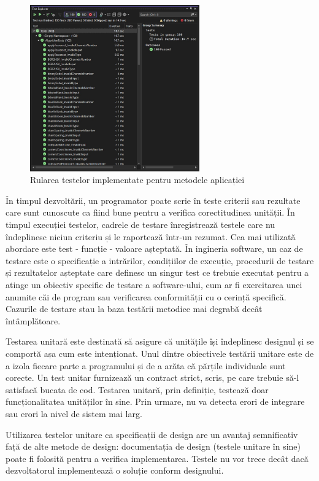 \documentclass[a4paper,12pt]{report}
\begin{document}
\begin{figure}[h!]
    \centering
    \includegraphics[width=0.65\textwidth]{images/tests.jpg}
    \caption{Rularea testelor implementate pentru metodele aplicației}
\end{figure}
\FloatBarrier

În timpul dezvoltării, un programator poate scrie în teste criterii sau rezultate care sunt cunoscute ca fiind bune pentru a verifica corectitudinea unității. În timpul execuției testelor, cadrele de testare înregistrează testele care nu îndeplinesc niciun criteriu și le raportează într-un rezumat. Cea mai utilizată abordare este test - funcție - valoare așteptată. În ingineria software, un caz de testare este o specificație a intrărilor, condițiilor de execuție, procedurii de testare și rezultatelor așteptate care definesc un singur test ce trebuie executat pentru a atinge un obiectiv specific de testare a software-ului, cum ar fi exercitarea unei anumite căi de program sau verificarea conformității cu o cerință specifică. Cazurile de testare stau la baza testării metodice mai degrabă decât întâmplătoare.

Testarea unitară este destinată să asigure că unitățile își îndeplinesc designul și se comportă așa cum este intenționat. Unul dintre obiectivele testării unitare este de a izola fiecare parte a programului și de a arăta că părțile individuale sunt corecte. Un test unitar furnizează un contract strict, scris, pe care trebuie să-l satisfacă bucata de cod. Testarea unitară, prin definiție, testează doar funcționalitatea unităților în sine. Prin urmare, nu va detecta erori de integrare sau erori la nivel de sistem mai larg.

Utilizarea testelor unitare ca specificații de design are un avantaj semnificativ față de alte metode de design: documentația de design (testele unitare în sine) poate fi folosită pentru a verifica implementarea. Testele nu vor trece decât dacă dezvoltatorul implementează o soluție conform designului.
\end{document}
